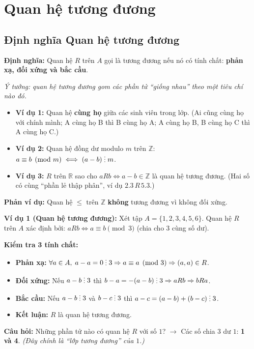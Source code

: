 \documentclass[12pt,a4paper]{article}
\newcommand{\chiahet}{\mathrel{\raisebox{-0.15ex}{\scalebox{0.85}{$\vdots$}}}}
\begin{document}
\section{Quan hệ tương đương}

\subsection{Định nghĩa Quan hệ tương đương}

\textbf{\textcolor{AccentRed}{Định nghĩa:}} Quan hệ $R$ trên $A$ gọi là \textcolor{AccentRed}{tương đương} nếu nó có tính chất: \textbf{phản xạ, đối xứng và bắc cầu}.

\textit{Ý tưởng: quan hệ tương đương gom các phần tử ``giống nhau'' theo một tiêu chí nào đó.}
\begin{itemize}
  \item \textbf{Ví dụ 1:} Quan hệ \textbf{cùng họ} giữa các sinh viên trong lớp. (Ai cũng cùng họ với chính mình; A cùng họ B thì B cùng họ A; A cùng họ B, B cùng họ C thì A cùng họ C.)
  \item \textbf{Ví dụ 2:} Quan hệ đồng dư modulo $m$ trên $\mathbb{Z}$: $a \equiv b \pmod{m} \iff (a - b) \chiahet m$.
  \item \textbf{Ví dụ 3:} $R$ trên $\mathbb{R}$ sao cho $aRb \iff a - b \in \mathbb{Z}$ là quan hệ tương đương. (Hai số có cùng ``phần lẻ thập phân'', ví dụ $2.3\,R\,5.3$.)
\end{itemize}
\textbf{Phản ví dụ:} Quan hệ $\le$ trên $\mathbb{Z}$ \textbf{không} tương đương vì không đối xứng.

\vspace{6pt}
\textbf{\textcolor{AccentRed}{Ví dụ 1 (Quan hệ tương đương):}} Xét tập $A = \{1, 2, 3, 4, 5, 6\}$. Quan hệ $R$ trên $A$ xác định bởi: $aRb \iff a \equiv b \pmod{3}$ (chia cho $3$ cùng số dư).

\textbf{\textcolor{PrimaryBlue}{Kiểm tra 3 tính chất:}}
\begin{itemize}
  \item \textbf{Phản xạ:} $\forall a \in A,\; a - a = 0 \chiahet 3 \Rightarrow a \equiv a \pmod{3} \Rightarrow (a, a) \in R$.
  \item \textbf{Đối xứng:} Nếu $a - b \chiahet 3$ thì $b - a = -(a - b) \chiahet 3 \Rightarrow aRb \Rightarrow bRa$.
  \item \textbf{Bắc cầu:} Nếu $a - b \chiahet 3$ và $b - c \chiahet 3$ thì $a - c = (a - b) + (b - c) \chiahet 3$.
  \item \textbf{Kết luận:} $R$ là quan hệ tương đương.
\end{itemize}
\textbf{Câu hỏi:} Những phần tử nào có quan hệ $R$ với số $1$? $\rightarrow$ Các số chia $3$ dư $1$: \textbf{1 và 4}. \textit{(Đây chính là ``lớp tương đương'' của $1$.)}
\end{document}
